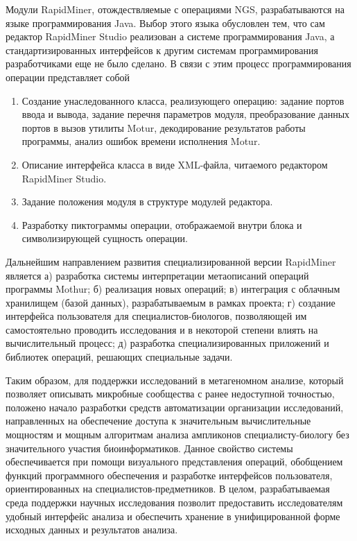 \documentclass[a4paper,12pt,openany,final]{extreport}
\begin{document}
Модули RapidMiner, отождествляемые с операциями NGS, разрабатываются на
языке программирования Java. Выбор этого языка обусловлен тем, что сам
редактор RapidMiner Studio реализован а системе программирования Java, а
стандартизированных интерфейсов к другим системам программирования
разработчиками еще не было сделано. В связи с этим процесс
программирования операции представляет собой

\begin{enumerate}
\def\labelenumi{\arabic{enumi}.}
\item
  Создание унаследованного класса, реализующего операцию: задание портов
  ввода и вывода, задание перечня параметров модуля, преобразование
  данных портов в вызов утилиты Motur, декодирование результатов работы
  программы, анализ ошибок времени исполнения Motur.
\item
  Описание интерфейса класса в виде XML-файла, читаемого редактором
  RapidMiner Studio.
\item
  Задание положения модуля в структуре модулей редактора.
\item
  Разработку пиктограммы операции, отображаемой внутри блока и
  символизирующей сущность операции.
\end{enumerate}

Дальнейшим направлением развития специализированной версии RapidMiner
является а) разработка системы интерпретации метаописаний операций
программы Mothur; б) реализация новых операций; в) интеграция с облачным
хранилищем (базой данных), разрабатываемым в рамках проекта; г) создание
интерфейса пользователя для специалистов-биологов, позволяющей им
самостоятельно проводить исследования и в некоторой степени влиять на
вычислительный процесс; д) разработка специализированных приложений и
библиотек операций, решающих специальные задачи.

Таким образом, для поддержки исследований в метагеномном анализе,
который позволяет описывать микробные сообщества с ранее недоступной
точностью, положено начало разработки средств автоматизации организации
исследований, направленных на обеспечение доступа к значительным
вычислительные мощностям и мощным алгоритмам анализа ампликонов
специалисту-биологу без значительного участия биоинформатиков. Данное
свойство системы обеспечивается при помощи визуального представления
операций, обобщением функций программного обеспечения и разработке
интерфейсов пользователя, ориентированных на специалистов-предметников.
В целом, разрабатываемая среда поддержки научных исследования позволит
предоставить исследователям удобный интерфейс анализа и обеспечить
хранение в унифицированной форме исходных данных и результатов анализа.
\end{document}
